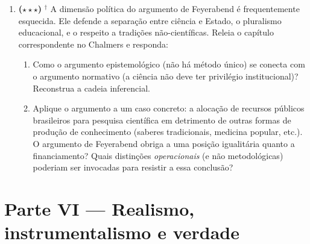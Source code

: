 \documentclass[10pt,a4paper]{extarticle}
\newcommand{\impt}[1]{\textcolor{important}{#1}}
\newcommand{\livro}{\textcolor{notice}{$^{\dagger}$}}
\newcommand{\difiii}{$\star\star\star$}
\begin{document}
\begin{enumerate}[label=\textbf{\arabic*.}, leftmargin=*, start=22]
\begin{enumerate}[label=(\alph*)]
    \item Qual é a justificativa epistemológica desse princípio? (Dica: relacione com a tese da carga teórica da observação.)
    \item Dê um exemplo, retirado da história da computação ou da inteligência artificial, em que uma linha de pesquisa avançou justamente porque alguns pesquisadores insistiram em uma abordagem que ia contra os ``fatos estabelecidos'' do campo. Exemplos plausíveis: redes neurais nos anos 1980--2010, métodos simbólicos antes do \emph{deep learning}, computação quântica. Escolha um e desenvolva.
    \item Em que esse princípio diverge da \impt{heurística positiva} de Lakatos? (Lakatos também admite que cientistas resistam a refutações --- mas em condições diferentes.)
\end{enumerate}

\item \textbf{(\difiii)} \livro{} A \impt{dimensão política} do argumento de Feyerabend é frequentemente esquecida. Ele defende a separação entre ciência e Estado, o pluralismo educacional, e o respeito a tradições não-científicas. Releia o capítulo correspondente no Chalmers e responda:

\begin{enumerate}[label=(\alph*)]
    \item Como o argumento epistemológico (não há método único) se conecta com o argumento normativo (a ciência não deve ter privilégio institucional)? Reconstrua a cadeia inferencial.
    \item Aplique o argumento a um caso concreto: a alocação de recursos públicos brasileiros para pesquisa científica em detrimento de outras formas de produção de conhecimento (saberes tradicionais, medicina popular, etc.). O argumento de Feyerabend obriga a uma posição igualitária quanto a financiamento? Quais distinções \emph{operacionais} (e não metodológicas) poderiam ser invocadas para resistir a essa conclusão?
\end{enumerate}

\end{enumerate}

\section*{Parte VI --- Realismo, instrumentalismo e verdade}
\end{document}
